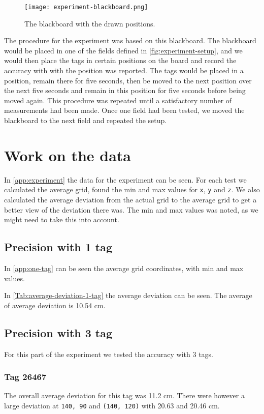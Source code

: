\begin{figure}[H]
    \centering
    \texttt{[image: experiment-blackboard.png]}
    \caption{The blackboard with the drawn positions.}
    \label{fig:experiment-blackboard}
\end{figure}
\noindent
The procedure for the experiment was based on this blackboard.
The blackboard would be placed in one of the fields defined in \autoref{fig:experiment-setup}, and we would then place the tags in certain positions on the board and record the accuracy with with the position was reported.
The tags would be placed in a position, remain there for five seconds, then be moved to the next position over the next five seconds and remain in this position for five seconds before being moved again.
This procedure was repeated until a satisfactory number of measurements had been made.
Once one field had been tested, we moved the blackboard to the next field and repeated the setup.
 
\section{Work on the data}
In \autoref{app:experiment} the data for the experiment can be seen.
For each test we calculated the average grid, found the min and max values for \texttt{x}, \texttt{y} and \texttt{z}.
We also calculated the average deviation from the actual grid to the average grid to get a better view of the deviation there was.
The min and max values was noted, as we might need to take this into account. 


\subsection{Precision with 1 tag} 
In \autoref{app:one-tag} can be seen the average grid coordinates, with min and max values.

In \autoref{Tab:average-deviation-1-tag} the average deviation can be seen.
The average of average deviation is 10.54 cm.

\subsection{Precision with 3 tag}
For this part of the experiment we tested the accuracy with 3 tags. 

\subsubsection{Tag 26467}
The overall average deviation for this tag was 11.2 cm.
There were however a large deviation at \texttt{140, 90} and \texttt{(140, 120)} with 20.63 and 20.46 cm.

